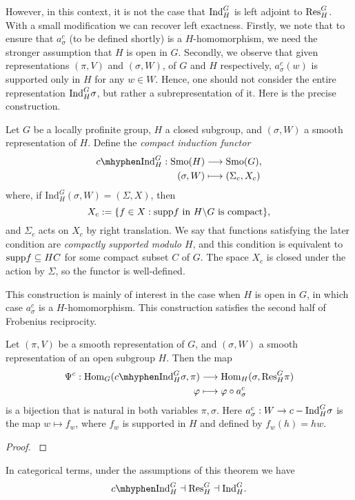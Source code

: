 However, in this context, it is not the case that $\mathrm{Ind}_H^G$ is left adjoint to $\mathrm{Res}_H^G$. With a small modification we can recover left exactness. Firstly, we note that to ensure that $a_\sigma^c$ (to be defined shortly) is a $H$-homomorphism, we need the stronger assumption that $H$ is open in $G$. Secondly, we observe that given representations $(\pi,V)$ and $(\sigma,W)$, of $G$ and $H$ respectively, $a_\sigma^c(w)$ is supported only in $H$ for any $w\in W$. Hence, one should not consider the entire representation $\mathrm{Ind}_H^G\sigma$, but rather a subrepresentation of it. Here is the precise construction.

\begin{defn}
	Let $G$ be a locally profinite group, $H$ a closed subgroup, and $(\sigma,W)$ a smooth representation of $H$. Define the \textit{compact induction functor} 
    \begin{align*}
        \cInd_H^G:\Smo(H)&\longrightarrow\Smo(G),\\
        (\sigma,W)&\longmapsto(\Sigma_c,X_c)
    \end{align*}
    where, if $\mathrm{Ind}_H^G(\sigma,W) = (\Sigma,X)$, then
    $$X_c:=\{f\in X: \mathrm{supp} f \text{ in } H\backslash G \text{ is compact}\},$$
    and $\Sigma_c$ acts on $X_c$ by right translation.
    We say that functions satisfying the later condition are \textit{compactly supported modulo $H$}, and this condition is equivalent to $\mathrm{supp} f\subseteq HC$ for some compact subset $C$ of $G$.
    The space $X_c$ is closed under the action by $\Sigma$, so the functor is well-defined.
\end{defn}

This construction is mainly of interest in the case when $H$ is open in $G$, in which case $a_\sigma^c$ is a $H$-homomorphism. This construction satisfies the second half of Frobenius reciprocity.

\begin{thm}\label{thm:frob2}
	Let $(\pi,V)$ be a smooth representation of $G$, and $(\sigma,W)$ a smooth representation of an open subgroup $H$. Then the map 
	\begin{align*}
		\Psi^c:\Hom_G(\cInd_H^G \sigma, \pi)&\longrightarrow \Hom_H(\sigma, \Res_H^G\pi)\\
		\varphi &\longmapsto \varphi \circ a^c_\sigma 
	\end{align*}
    is a bijection that is natural in both variables $\pi,\sigma$. Here $a^c_\sigma: W\to c-\mathrm{Ind}_H^G \sigma$ is the map $w\mapsto f_w$, where $f_w$ is supported in $H$ and defined by $f_w(h) = hw$.
\end{thm}
\begin{proof}
    \cite[2.5 Theorem]{BH1}
\end{proof}
In categorical terms, under the assumptions of this theorem we have
$$\cInd_H^G\dashv\Res_H^G\dashv\Ind_H^G.$$